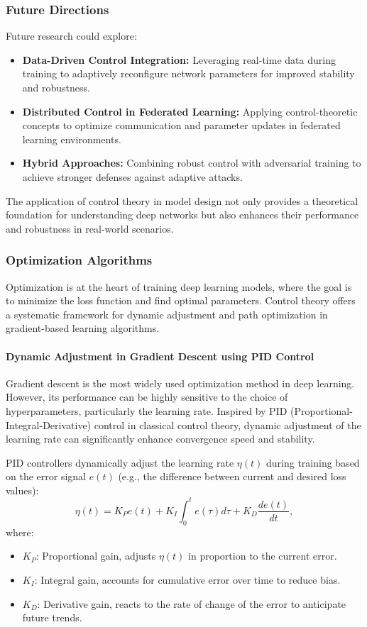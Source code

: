 \documentclass{IEEEojcsys}
\begin{document}
\subsubsection{Future Directions}
Future research could explore:
\begin{itemize}
    \item \textbf{Data-Driven Control Integration:} Leveraging real-time data during training to adaptively reconfigure network parameters for improved stability and robustness.
    \item \textbf{Distributed Control in Federated Learning:} Applying control-theoretic concepts to optimize communication and parameter updates in federated learning environments.
    \item \textbf{Hybrid Approaches:} Combining robust control with adversarial training to achieve stronger defenses against adaptive attacks.
\end{itemize}

The application of control theory in model design not only provides a theoretical foundation for understanding deep networks but also enhances their performance and robustness in real-world scenarios.

\subsubsection{Optimization Algorithms}
Optimization is at the heart of training deep learning models, where the goal is to minimize the loss function and find optimal parameters. Control theory offers a systematic framework for dynamic adjustment and path optimization in gradient-based learning algorithms.

\paragraph{Dynamic Adjustment in Gradient Descent using PID Control}
Gradient descent is the most widely used optimization method in deep learning. However, its performance can be highly sensitive to the choice of hyperparameters, particularly the learning rate. Inspired by PID (Proportional-Integral-Derivative) control in classical control theory, dynamic adjustment of the learning rate can significantly enhance convergence speed and stability.

PID controllers dynamically adjust the learning rate $\eta(t)$ during training based on the error signal $e(t)$ (e.g., the difference between current and desired loss values):
\[
\eta(t) = K_P e(t) + K_I \int_0^t e(\tau) d\tau + K_D \frac{de(t)}{dt},
\]
where:
\begin{itemize}
    \item $K_P$: Proportional gain, adjusts $\eta(t)$ in proportion to the current error.
    \item $K_I$: Integral gain, accounts for cumulative error over time to reduce bias.
    \item $K_D$: Derivative gain, reacts to the rate of change of the error to anticipate future trends.
\end{itemize}
\end{document}
